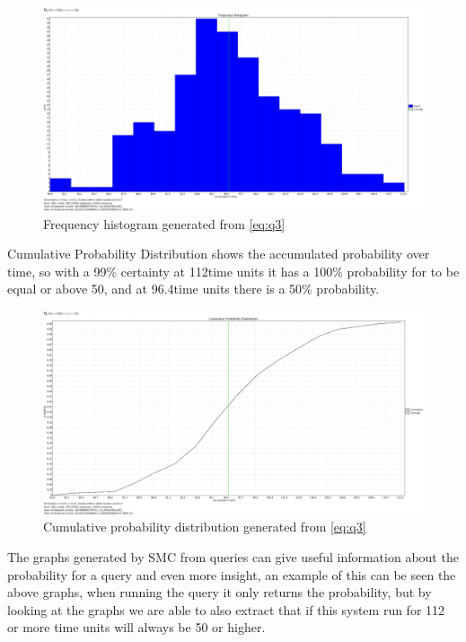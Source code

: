 \begin{figure}[!h]
	\includegraphics[width=\textwidth]{graphics/eq3fh.png}
	\caption{Frequency histogram generated from \cref{eq:q3}}
	\label{fig:eq3fh}
\end{figure}

Cumulative Probability Distribution shows the accumulated probability over time, so with a 99\% certainty at 112time units it has a 100\% probability for  to be equal or above 50, and at 96.4time units there is a 50\% probability.

\begin{figure}[!h]
	\includegraphics[width=\textwidth]{graphics/eq3cpd.png}
	\caption{Cumulative probability distribution generated from \cref{eq:q3}}
	\label{fig:eq3cpd}
\end{figure}

The graphs generated by SMC from queries can give useful information about the probability for a query and even more insight, an example of this can be seen the above graphs, when running the query it only returns the probability, but by looking at the graphs we are able to also extract that if this system run for 112 or more time units  will always be 50 or higher.



